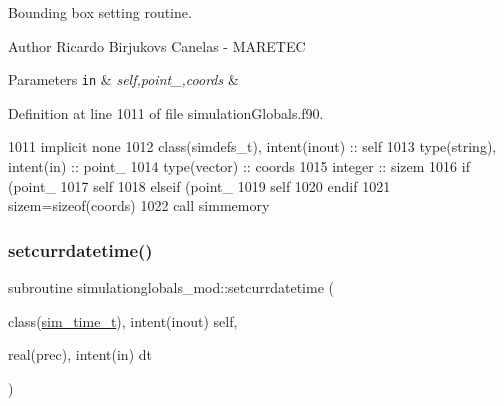 Bounding box setting routine. 

\begin{DoxyAuthor}{Author}
Ricardo Birjukovs Canelas -\/ M\+A\+R\+E\+T\+EC 
\end{DoxyAuthor}

\begin{DoxyParams}[1]{Parameters}
\mbox{\tt in}  & {\em self,point\+\_\+,coords} & \\
\hline
\end{DoxyParams}


Definition at line 1011 of file simulation\+Globals.\+f90.


\begin{DoxyCode}
1011     \textcolor{keywordtype}{implicit none}
1012     \textcolor{keywordtype}{class}(simdefs\_t), \textcolor{keywordtype}{intent(inout)} :: self
1013     \textcolor{keywordtype}{type}(string), \textcolor{keywordtype}{intent(in)} :: point\_
1014     \textcolor{keywordtype}{type}(vector) :: coords
1015     \textcolor{keywordtype}{integer} :: sizem
1016     \textcolor{keywordflow}{if} (point\_%
1017         self%
1018     \textcolor{keywordflow}{elseif} (point\_%
1019         self%
1020 \textcolor{keywordflow}{    endif}
1021     sizem=sizeof(coords)
1022     \textcolor{keyword}{call }simmemory%
\end{DoxyCode}
\mbox{\label{namespacesimulationglobals__mod_acbb28eee5547a03dc28c924d8e23ad9a}} 
\subsubsection{\texorpdfstring{setcurrdatetime()}{setcurrdatetime()}}
{\footnotesize\ttfamily subroutine simulationglobals\+\_\+mod\+::setcurrdatetime (\begin{DoxyParamCaption}\item[{class(\mbox{\hyperlink{structsimulationglobals__mod_1_1sim__time__t}{sim\+\_\+time\+\_\+t}}), intent(inout)}]{self,  }\item[{real(prec), intent(in)}]{dt }\end{DoxyParamCaption})\hspace{0.3cm}{\ttfamily [private]}}



